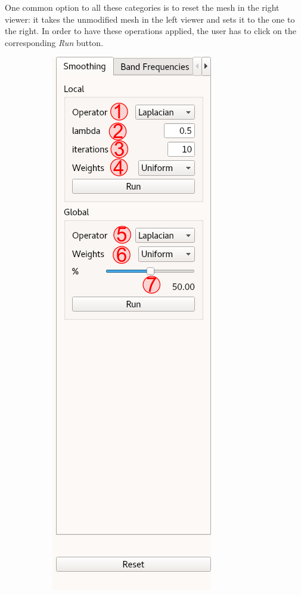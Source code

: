 \documentclass[12pt]{article}
\begin{document}
One common option to all these categories is to reset the mesh in the
right viewer: it takes the unmodified mesh in the left viewer and sets
it to the one to the right. In order to have these operations applied,
the user has to click on the corresponding \textit{Run} button.

\begin{figure}[H]
	\centering
	\begin{subfigure}{0.32\textwidth}
		\centering
		\includegraphics[scale=0.24]{DV-smoothing}

\end{subfigure}
\end{figure}
\end{document}
